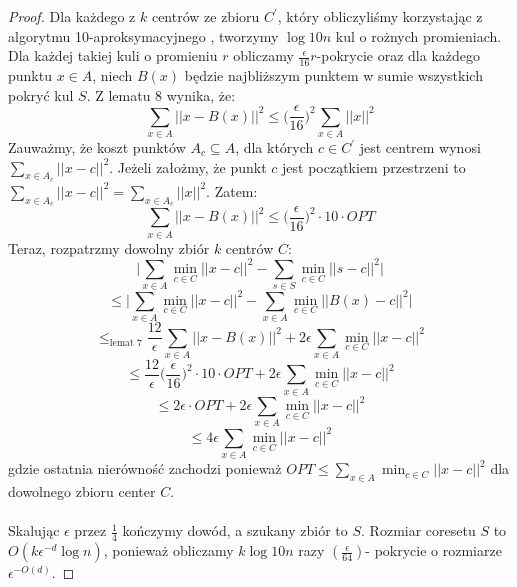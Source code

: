 \begin{proof}
    Dla każdego z $k$ centrów ze zbioru $C^{'}$, który obliczyliśmy korzystając z algorytmu 10-aproksymacyjnego \cite{Arya2004LocalSH}, tworzymy $\log 10n$ kul o rożnych promieniach.
    Dla każdej takiej kuli o promieniu $r$ obliczamy $\frac{\epsilon}{16}r$-pokrycie oraz dla każdego punktu $x \in A$, niech $B(x)$ będzie najbliższym punktem w sumie wszystkich pokryć kul $S$.
    Z lematu 8 wynika, że:
    \begin{equation}
        \sum_{x\in A} ||x - B(x)||^{2} \leq \Big( \frac{\epsilon}{16} \Big)^{2} \sum_{x\in A} ||x||^{2}
    \end{equation}
    Zauważmy, że koszt punktów $A_{c} \subseteq A$, dla których $c \in C^{'}$ jest centrem wynosi $\sum_{x\in A_{c}} ||x - c||^{2}$.
    Jeżeli założmy, że punkt $c$ jest początkiem przestrzeni to $\sum_{x\in A_{c}} ||x - c||^{2} = \sum_{x\in A_{c}} ||x||^{2}$.
    Zatem:
    \begin{equation}
        \sum_{x\in A} ||x - B(x)||^{2} \leq \Big( \frac{\epsilon}{16} \Big)^{2} \cdot 10 \cdot OPT
    \end{equation}
    Teraz, rozpatrzmy dowolny zbiór $k$ centrów $C$:
    \begin{equation}
        \Big|\sum_{x\in A} \min_{c \in C} ||x - c||^{2} - \sum_{s\in S} \min_{c \in C} ||s - c||^{2}\Big|
    \end{equation}
    \begin{equation}
        \leq\Big|\sum_{x\in A} \min_{c \in C} ||x - c||^{2} - \sum_{x\in A} \min_{c \in C} ||B(x) - c||^{2}\Big|
    \end{equation}
    \begin{equation}
        \leq_{\text{lemat 7}} \frac{12}{\epsilon} \sum_{x\in A} ||x - B(x)||^{2} + 2\epsilon \sum_{x\in A} \min_{c \in C} ||x - c||^{2}
    \end{equation}
    \begin{equation}
        \leq \frac{12}{\epsilon} \Big( \frac{\epsilon}{16} \Big)^{2} \cdot 10 \cdot OPT + 2\epsilon \sum_{x\in A} \min_{c \in C} ||x - c||^{2}
    \end{equation}
    \begin{equation}
        \leq 2\epsilon \cdot OPT + 2\epsilon \sum_{x\in A} \min_{c \in C} ||x - c||^{2}
    \end{equation}
    \begin{equation}
        \leq 4\epsilon \sum_{x\in A} \min_{c \in C} ||x - c||^{2}
    \end{equation}
    gdzie ostatnia nierówność zachodzi ponieważ $OPT \leq \sum_{x\in A} \min_{c \in C} ||x - c||^{2}$ dla dowolnego zbioru center $C$.
    \\~\\
    Skalując $\epsilon$ przez $\frac{1}{4}$ kończymy dowód, a szukany zbiór to $S$.
    Rozmiar coresetu $S$ to $O(k\epsilon^{-d} \log n)$, ponieważ obliczamy $k \log 10n$ razy $(\frac{\epsilon}{64})$- pokrycie o rozmiarze $\epsilon^{-O(d)}$.
\end{proof}
